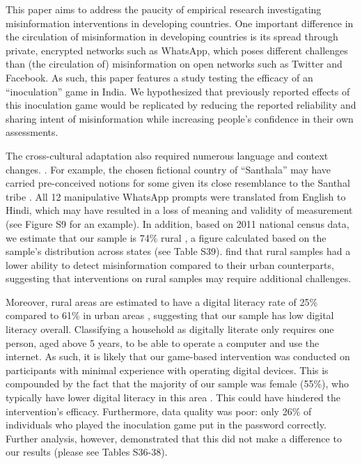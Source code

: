 \documentclass[empirical, authordate]{jote-new-article}
\begin{document}
\begin{originalPurpose}
  This paper aims to address the paucity of empirical research investigating misinformation interventions in developing countries. One important difference in the circulation of misinformation in developing countries is its spread through private, encrypted networks such as \mbox{WhatsApp}, which poses different challenges than (the circulation of) misinformation on open networks such as Twitter and Facebook. As such, this paper features a study testing the efficacy of an “inoculation” game in India. We hypothesized that previously reported effects of this inoculation game would be replicated by reducing the reported reliability and sharing intent of misinformation while increasing people's confidence in their own assessments.
\end{originalPurpose}

The cross-cultural adaptation also required numerous language and context changes. \parencite{Roozenbeek2020}. For example, the chosen fictional country of “Santhala” may have carried pre-conceived notions for some given its close resemblance to the Santhal tribe \parencite{EncyclopaediaBritannica2012}. All 12 manipulative \mbox{WhatsApp} prompts were translated from English to Hindi, which may have resulted in a loss of meaning and validity of measurement (see Figure S9 for an example). In addition, based on 2011 national census data, we estimate that our sample is 74\% rural \parencite{India2016}, a figure calculated based on the sample's distribution across states (see Table S39). \textcite{Shahid2022} find that rural samples had a lower ability to detect misinformation compared to their urban counterparts, suggesting that interventions on rural samples may require additional challenges.

Moreover, rural areas are estimated to have a digital literacy rate of 25\% compared to 61\% in urban areas \parencite{Mothkoor2021}, suggesting that our sample has low digital literacy overall. Classifying a household as digitally literate only requires one person, aged above 5 years, to be able to operate a computer and use the internet. As such, it is likely that our game-based intervention was conducted on participants with minimal experience with operating digital devices. This is compounded by the fact that the majority of our sample was female (55\%), who typically have lower digital literacy in this area \parencite{Rowntree2020}. This could have hindered the intervention's efficacy. Furthermore, data quality was poor: only 26\% of individuals who played the inoculation game put in the password correctly. Further analysis, however, demonstrated that this did not make a difference to our results (please see Tables S36-38).
\end{document}
